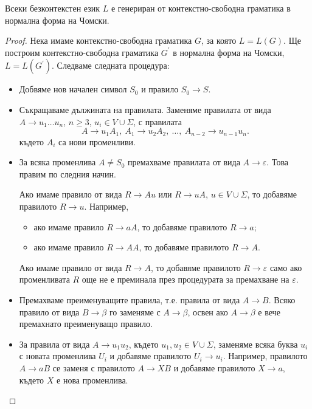 \begin{thm}
  Всеки безконтекстен език $L$ е генериран от контекстно-свободна
  граматика в нормална форма на Чомски.
\end{thm}
\begin{proof}
  Нека имаме контекстно-свободна граматика $G$, за която $L = L(G)$.
  Ще построим контекстно-свободна граматика $G^\prime$ в нормална форма на Чомски, $L = L(G^\prime)$.
  Следваме следната процедура:
  \begin{itemize}
  \item
    Добвяме нов начален символ $S_0$ и правило $S_0 \to S$.
  \item
    Съкращаваме дължината на правилата.
    Заменяме правилата от вида $A\to u_1\dots u_n$, $n\geq 3$, $u_i \in V\cup\Sigma$, с
    правилата \[A\to u_1A_1,\ A_1\to u_2A_2,\ \dots,\ A_{n-2} \to u_{n-1}u_n.\]
    където $A_i$ са нови променливи.
  \item
    За всяка променлива $A \neq S_0$ премахваме правилата от вида $A\to\varepsilon$.
    Това правим по следния начин.
    
    Ако имаме правило от вида $R \to Au$ или $R\to u A$, $u \in V \cup \Sigma$,
    то добавяме правилото $R\to u$.
    Например, 
    \begin{itemize}
    \item 
      ако имаме правило $R\to aA$, то добавяме правилото $R \to a$;
    \item
      ако имаме правило $R\to AA$, то добавяме правилото $R \to A$.
    \end{itemize}
    Ако имаме правило от вида $R\to A$, то добавяме правилото $R\to\varepsilon$
    само ако променливата $R$ още не е преминала през процедурата за премахване на $\varepsilon$.
  \item
    Премахваме преименуващите правила, т.е. правила от вида $A\to B$.
    Всяко правило от вида $B \to \beta$ го заменяме с $A\to \beta$,
    освен ако $A \to \beta$ е вече премахнато преименуващо правило.
  \item
    За правила от вида $A\to u_1 u_2$, където $u_1, u_2 \in V \cup \Sigma$, 
    заменяме всяка буква $u_i$ с новата променлива $U_i$
    и добавяме правилото $U_i\to u_i$.
    Например, правилото $A \to aB$ се заменя с правилото $A \to XB$ и добавяме правилото $X \to a$,
    където $X$ е нова променлива.
  \end{itemize}
\end{proof}

